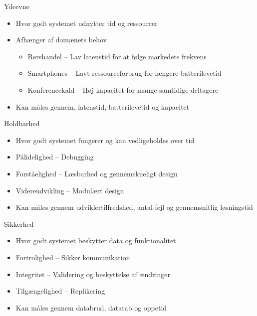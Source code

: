 \documentclass{beamer}
\begin{document}
\begin{frame}{Ydeevne}
  \begin{itemize}
    \item Hvor godt systemet udnytter tid og ressourcer
    \item Afhænger af domænets behov
      \begin{itemize}
        \item Børshandel -- Lav latenstid for at følge markedets frekvens
        \item Smartphones -- Lavt ressourceforbrug for længere batterilevetid
        \item Konferencekald -- Høj kapacitet for mange samtidige deltagere
      \end{itemize}
    \item Kan måles gennem, latenstid, batterilevetid og kapacitet
  \end{itemize}
\end{frame}

\begin{frame}{Holdbarhed}
  \begin{itemize}
    \item Hvor godt systemet fungerer og kan vedligeholdes over tid
    \item Pålidelighed -- Debugging
    \item Forståelighed -- Læsbarhed og gennemskueligt design
    \item Videreudvikling -- Modulært design
    \item Kan måles gennem udviklertilfredshed, antal fejl og gennemsnitlig løsningstid
  \end{itemize}
\end{frame}

\begin{frame}{Sikkerhed}
  \begin{itemize}
    \item Hvor godt systemet beskytter data og funktionalitet
    \item Fortrolighed -- Sikker kommunikation
    \item Integritet -- Validering og beskyttelse af ændringer
    \item Tilgængelighed -- Replikering
    \item Kan måles gennem databrud, datatab og oppetid~\cite{nist_cia}
  \end{itemize}
\end{frame}
\end{document}
